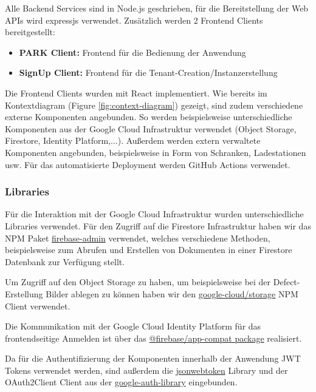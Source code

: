 Alle Backend Services sind in Node.js geschrieben, für die Bereitstellung der Web APIs wird expressjs verwendet.
Zusätzlich werden 2 Frontend Clients bereitgestellt:

\begin{itemize}
    \item \textbf{PARK Client:} Frontend für die Bedienung der Anwendung
    \item \textbf{SignUp Client:} Frontend für die Tenant-Creation/Instanzerstellung
\end{itemize}

Die Frontend Clients wurden mit React implementiert. Wie bereits im Kontextdiagram (Figure \ref{fig:context-diagram}) gezeigt, sind zudem verschiedene externe Komponenten angebunden. So werden beispielsweise unterschiedliche Komponenten aus der Google Cloud Infrastruktur verwendet (Object Storage, Firestore, Identity Platform,...). Außerdem werden extern verwaltete Komponenten angebunden, beispielsweise in Form von Schranken, Ladestationen usw. Für das automatisierte Deployment werden GitHub Actions verwendet.

\subsubsection{Libraries}
Für die Interaktion mit der Google Cloud Infrastruktur wurden unterschiedliche Libraries verwendet. Für den Zugriff auf die Firestore Infrastruktur haben wir das NPM Paket \href{hhttps://www.npmjs.com/package/firebase-admin}{firebase-admin} verwendet, welches verschiedene Methoden, beispielsweise zum Abrufen und Erstellen von Dokumenten in einer Firestore Datenbank zur Verfügung stellt.

Um Zugriff auf den Object Storage zu haben, um beispielsweise bei der Defect-Erstellung Bilder ablegen zu können haben wir den \href{https://www.npmjs.com/package/@google-cloud/storage}{google-cloud/storage} NPM Client verwendet.

Die Kommunikation mit der Google Cloud Identity Platform für das frontendseitige Anmelden ist über das \href{https://www.npmjs.com/package/@firebase/app-compat}{@firebase/app-compat package} realisiert.

Da für die Authentifizierung der Komponenten innerhalb der Anwendung JWT Tokens verwendet werden, sind außerdem die \href{https://www.npmjs.com/package/jsonwebtoken}{jsonwebtoken} Library und der OAuth2Client Client aus der \href{https://www.npmjs.com/package/google-auth-library}{google-auth-library} eingebunden.

